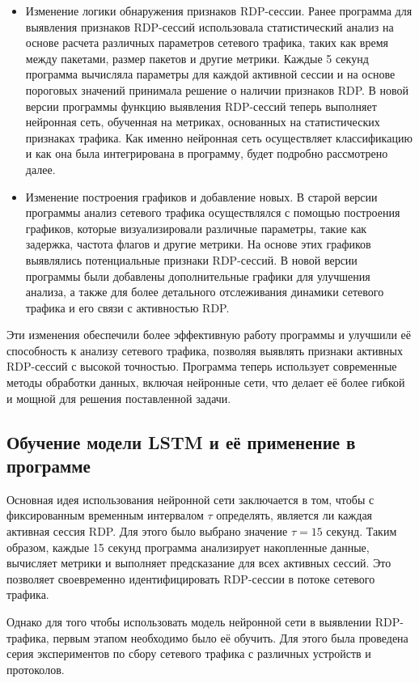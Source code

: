 \documentclass[bachelor, och, coursework]{SCWorks}
\begin{document}
\begin{itemize}
  \item Изменение логики обнаружения признаков RDP-сессии. Ранее программа для выявления признаков RDP-сессий использовала статистический анализ 
  на основе расчета различных параметров сетевого трафика, таких как время между пакетами, размер пакетов и другие метрики. Каждые 5 секунд программа 
  вычисляла параметры для каждой активной сессии и на основе пороговых значений принимала решение о наличии признаков RDP. В новой версии программы 
  функцию выявления RDP-сессий теперь выполняет нейронная сеть, обученная на метриках, основанных на статистических признаках трафика. Как именно 
  нейронная сеть осуществляет классификацию и как она была интегрирована в программу, будет подробно рассмотрено далее.

  \item Изменение построения графиков и добавление новых. В старой версии программы анализ сетевого трафика осуществлялся с помощью построения 
  графиков, которые визуализировали различные параметры, такие как задержка, частота флагов и другие метрики. На основе этих графиков выявлялись потенциальные 
  признаки RDP-сессий. В новой версии программы были добавлены дополнительные графики для улучшения анализа, а также для более детального отслеживания динамики 
  сетевого трафика и его связи с активностью RDP.
\end{itemize}

Эти изменения обеспечили более эффективную работу программы и улучшили её способность к анализу сетевого трафика, позволяя выявлять признаки 
активных RDP-сессий с высокой точностью. Программа теперь использует современные методы обработки данных, включая нейронные сети, что делает 
её более гибкой и мощной для решения поставленной задачи.

\subsection{Обучение модели LSTM и её применение в программе}

Основная идея использования нейронной сети заключается в том, чтобы с фиксированным временным интервалом $\tau$ определять, 
является ли каждая активная сессия RDP. Для этого было выбрано значение $\tau = 15$ секунд. Таким образом, каждые 15 секунд 
программа анализирует накопленные данные, вычисляет метрики и выполняет предсказание для всех активных сессий. Это позволяет 
своевременно идентифицировать RDP-сессии в потоке сетевого трафика.  

Однако для того чтобы использовать модель нейронной сети в выявлении RDP-трафика, первым этапом необходимо было её обучить. Для этого была проведена 
серия экспериментов по сбору сетевого трафика с различных устройств и протоколов.  
\end{document}
